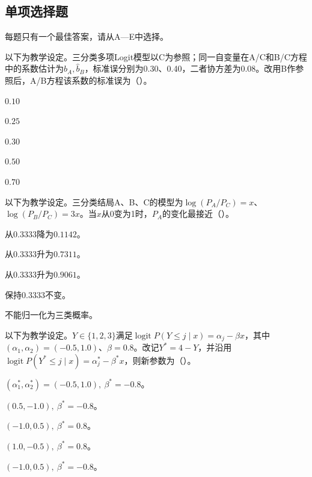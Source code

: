 \subsection{单项选择题}
每题只有一个最佳答案，请从A—E中选择。

\par\noindent\begin{minipage}{\linewidth}
以下为教学设定。三分类多项Logit模型以C为参照；同一自变量在A/C和B/C方程中的系数估计为$\hat b_A,\hat b_B$，标准误分别为0.30、0.40，二者协方差为0.08。改用B作参照后，A/B方程该系数的标准误为（\quad）。
\begin{choices}
\item $0.10$
\item $0.25$
\item $0.30$
\item $0.50$
\item $0.70$
\end{choices}
\end{minipage}\par\medskip

\par\noindent\begin{minipage}{\linewidth}
以下为教学设定。三分类结局A、B、C的模型为$\log(P_A/P_C)=x$、$\log(P_B/P_C)=3x$。当$x$从0变为1时，$P_A$的变化最接近（\quad）。
\begin{choices}
\item 从$0.3333$降为$0.1142$。
\item 从$0.3333$升为$0.7311$。
\item 从$0.3333$升为$0.9061$。
\item 保持$0.3333$不变。
\item 不能归一化为三类概率。
\end{choices}
\end{minipage}\par\medskip

\par\noindent\begin{minipage}{\linewidth}
以下为教学设定。$Y\in\{1,2,3\}$满足$\operatorname{logit}P(Y\le j\mid x)=\alpha_j-\beta x$，其中$(\alpha_1,\alpha_2)=(-0.5,1.0)$、$\beta=0.8$。改记$Y^\ast=4-Y$，并沿用$\operatorname{logit}P(Y^\ast\le j\mid x)=\alpha_j^\ast-\beta^\ast x$，则新参数为（\quad）。
\begin{choices}
\item $(\alpha_1^\ast,\alpha_2^\ast)=(-0.5,1.0),\ \beta^\ast=-0.8$。
\item $(0.5,-1.0),\ \beta^\ast=-0.8$。
\item $(-1.0,0.5),\ \beta^\ast=0.8$。
\item $(1.0,-0.5),\ \beta^\ast=0.8$。
\item $(-1.0,0.5),\ \beta^\ast=-0.8$。
\end{choices}
\end{minipage}\par\medskip

